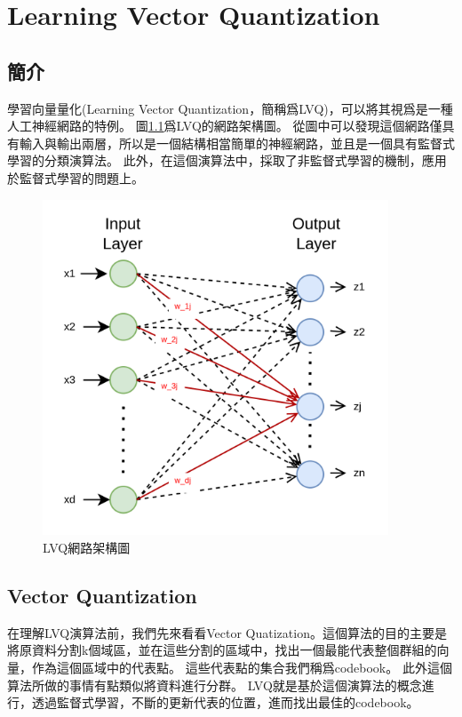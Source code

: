 \chapter{Learning Vector Quantization}
\label{chapter:intro}
\section{簡介}


學習向量量化(Learning Vector Quantization，簡稱爲LVQ)，可以將其視爲是一種人工神經網路的特例。
圖\ref{fig:lvq_network}爲LVQ的網路架構圖。
從圖中可以發現這個網路僅具有輸入與輸出兩層，所以是一個結構相當簡單的神經網路，並且是一個具有監督式學習的分類演算法。
此外，在這個演算法中，採取了非監督式學習的機制，應用於監督式學習的問題上。


\begin{figure}[h]
	\centering
	\includegraphics[height=10cm]{./pic/zMBsAkkS.png}
	\caption{LVQ網路架構圖}
	\label{fig:lvq_network}
\end{figure}
\label{sec:background}


\section{Vector Quantization}
在理解LVQ演算法前，我們先來看看Vector Quatization。這個算法的目的主要是將原資料分割k個域區，並在這些分割的區域中，找出一個最能代表整個群組的向量，作為這個區域中的代表點。
這些代表點的集合我們稱爲codebook。
此外這個算法所做的事情有點類似將資料進行分群。
LVQ就是基於這個演算法的概念進行，透過監督式學習，不斷的更新代表的位置，進而找出最佳的codebook。


